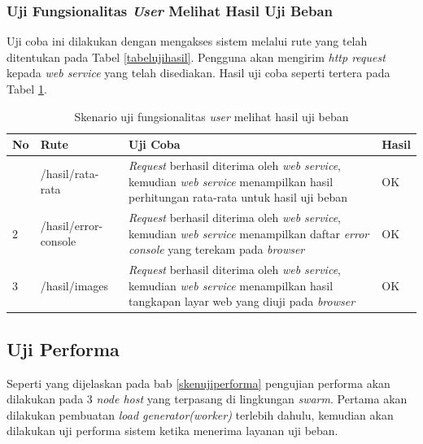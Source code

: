 			\subsubsection{Uji Fungsionalitas \textit{User} Melihat Hasil Uji Beban}
				Uji coba ini dilakukan dengan mengakses sistem melalui rute yang telah ditentukan pada Tabel \ref{tabelujihasil}. Pengguna akan mengirim \textit{http request} kepada \textit{web service} yang telah
				disediakan. Hasil uji coba seperti tertera pada Tabel \ref{tabelhasilujihasil}.
				\begin{longtable}{|p{}|p{}|p{}|p{}|}
					\caption{Skenario uji fungsionalitas \textit{user} melihat hasil uji beban} \label{tabelhasilujihasil} \\ \hline
					\textbf{No} & \textbf{Rute} & \textbf{Uji Coba} & \textbf{Hasil} \\ \hline
					\endhead
					\endfoot
					\endlastfoot
					1 & /hasil/rata-rata & \textit{Request} berhasil diterima oleh \textit{web service}, kemudian \textit{web service} menampilkan hasil perhitungan rata-rata untuk hasil uji beban & OK \\ \hline
					2 & /hasil/error-console & \textit{Request} berhasil diterima oleh \textit{web service}, kemudian \textit{web service} menampilkan daftar \textit{error console} yang terekam pada \textit{browser} & OK \\ \hline
					3 & /hasil/images & \textit{Request} berhasil diterima oleh \textit{web service}, kemudian \textit{web service} menampilkan hasil tangkapan layar web yang diuji pada \textit{browser} & OK \\ \hline
				\end{longtable}
				

		\subsection{Uji Performa}
			Seperti yang dijelaskan pada bab \ref{skenujiperforma} pengujian performa akan dilakukan pada 3 \textit{node host} yang terpasang di lingkungan \textit{swarm}. Pertama akan dilakukan pembuatan \textit{load generator(worker)} terlebih dahulu, kemudian akan dilakukan uji performa sistem ketika menerima layanan uji beban.
			
